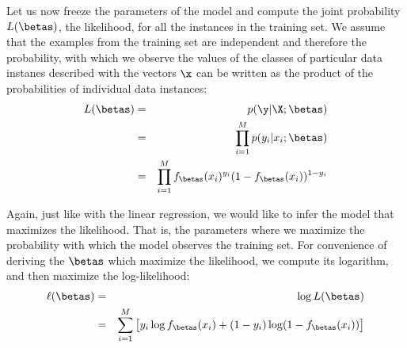 \begin{refsection}
Let us now freeze the parameters of the model and compute the joint probability $L(\betas)$, the likelihood, for all the instances in the training set. We assume that the examples from the training set are independent and therefore the probability, with which we observe the values of the classes of particular data instanes described with the vectors $\x$ can be written as the product of the probabilities of individual data instances:
\begin{eqnarray}
  L(\betas) & = & p(\y|\X;\betas) \nonumber\\
  & = & \prod_{i=1}^M p(y_i|x_i;\betas) \nonumber\\
  & = & \prod_{i=1}^M f_{\betas}(x_i)^{y_i}(1-f_{\betas}(x_i))^{1-y_i}
\end{eqnarray}

Again, just like with the linear regression, we would like to infer the model that maximizes the likelihood. That is, the parameters where we maximize the probability with which the model observes the training set. For convenience of deriving the $\betas$ which maximize the likelihood, we compute its logarithm, and then maximize the log-likelihood:
\begin{eqnarray}
  \ell(\betas) & = & \log L(\betas) \nonumber\\
  & = & \sum_{i=1}^M\big[y_i\log f_{\betas}(x_i)+(1-y_i)\log (1-f_{\betas}(x_i)) \big]
\end{eqnarray}


\end{refsection}
